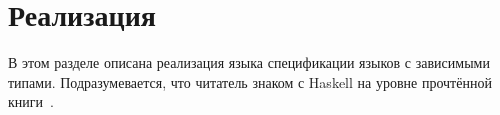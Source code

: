 \section{Реализация} \label{impl_section}
В этом разделе описана реализация языка спецификации языков с зависимыми типами. Подразумевается, что читатель знаком с Haskell на уровне прочтённой книги~\cite{moronuki}.












